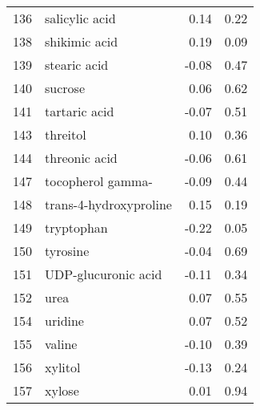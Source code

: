 \begin{tabular}{llrr}
136 &                     salicylic acid &                 0.14 &     0.22 \\
138 &                      shikimic acid &                 0.19 &     0.09 \\
139 &                       stearic acid &                -0.08 &     0.47 \\
140 &                            sucrose &                 0.06 &     0.62 \\
141 &                      tartaric acid &                -0.07 &     0.51 \\
143 &                           threitol &                 0.10 &     0.36 \\
144 &                      threonic acid &                -0.06 &     0.61 \\
147 &                  tocopherol gamma- &                -0.09 &     0.44 \\
148 &             trans-4-hydroxyproline &                 0.15 &     0.19 \\
149 &                         tryptophan &                -0.22 &     0.05 \\
150 &                           tyrosine &                -0.04 &     0.69 \\
151 &                UDP-glucuronic acid &                -0.11 &     0.34 \\
152 &                               urea &                 0.07 &     0.55 \\
154 &                            uridine &                 0.07 &     0.52 \\
155 &                             valine &                -0.10 &     0.39 \\
156 &                            xylitol &                -0.13 &     0.24 \\
157 &                             xylose &                 0.01 &     0.94 \\
\bottomrule
\end{tabular}
